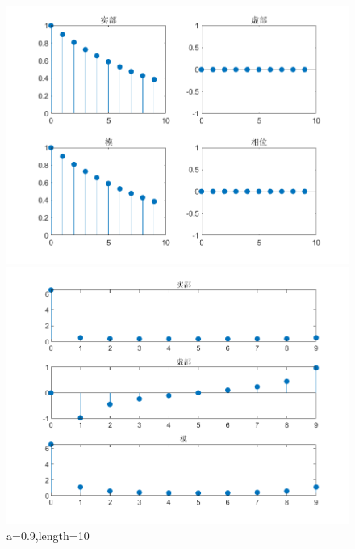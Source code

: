 \documentclass{../source/zjureport}
\begin{document}
                \begin{figure}[H]
                    \centering
                    \begin{minipage}[t]{0.48\textwidth}
                    \centering
                    \includegraphics[width=\textwidth]{figure/实指数序列_a=09,length=10.png}
                    \end{minipage}
                    \begin{minipage}[t]{0.48\textwidth}
                    \centering
                    \includegraphics[width=\textwidth]{figure/频谱_实指数序列_a=09,length=10.png}
                    \end{minipage}
                    \caption{a=0.9,length=10}
                \end{figure}
                
\end{document}
